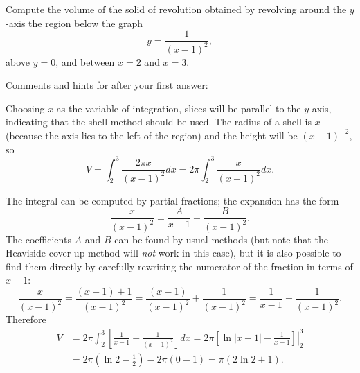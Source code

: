 \documentclass{ximera}
\begin{document}
\begin{question}%
Compute the volume of the solid of revolution obtained by revolving around the $y$-axis the region below the graph
\[ y = \frac{1}{(x-1)^2}, \]
above $y=0$, and between $x=2$ and $x=3$.
\begin{multiplechoice}
\choice{\(\displaystyle \pi\)}
\end{multiplechoice}
Comments and hints for after your first answer:
\begin{feedback}
Choosing $x$ as the variable of integration, slices will be parallel to the $y$-axis, indicating that the shell method should be used. The radius of a shell is $x$ (because the axis lies to the left of the region) and the height will be $(x-1)^{-2}$, so 
\[ V = \int_2^3 \frac{2 \pi x}{(x-1)^2} dx = 2 \pi \int_2^3 \frac{x}{(x-1)^2} dx. \] \begin{hint}
The integral can be computed by partial fractions; the expansion has the form
\[ \frac{x}{(x-1)^2} = \frac{A}{x-1} + \frac{B}{(x-1)^2}. \]
The coefficients $A$ and $B$ can be found by usual methods (but note that the Heaviside cover up method will \textit{not} work in this case), but it is also possible to find them directly by carefully rewriting the numerator of the fraction in terms of $x-1$:
\[ \frac{x}{(x-1)^2} = \frac{(x-1) + 1}{(x-1)^2} = \frac{(x-1)}{(x-1)^2} + \frac{1}{(x-1)^2} = \frac{1}{x-1} + \frac{1}{(x-1)^2}. \]
Therefore
\[ \begin{aligned} V & = 2 \pi \int_2^3 \left[ \frac{1}{x-1} + \frac{1}{(x-1)^2} \right] dx = 2 \pi \left. \left[ \ln |x-1| - \frac{1}{x-1} \right] \right|_{2}^3 \\
& = 2 \pi \left( \ln 2 - \frac{1}{2} \right) - 2 \pi \left( 0 - 1 \right) = \pi(2 \ln 2 + 1). \end{aligned}\] \end{hint}
\end{feedback}

\end{question}
\end{document}
